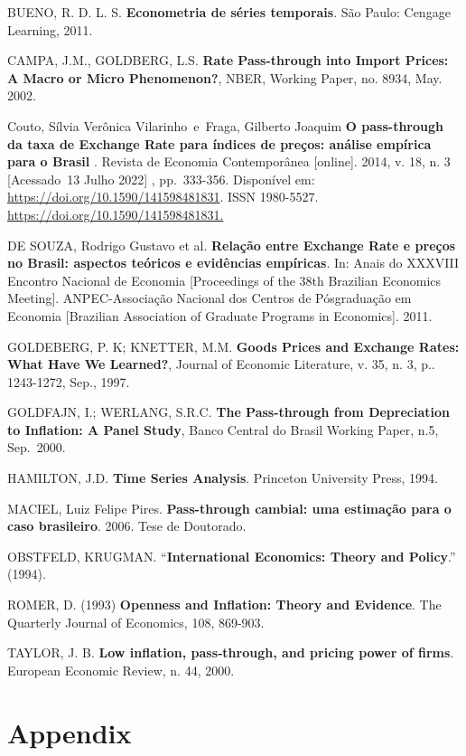 \documentclass[12pt]{article}
\begin{document}
BUENO, R. D. L. S. \textbf{Econometria de séries temporais}. São Paulo:
Cengage Learning, 2011.

CAMPA, J.M., GOLDBERG, L.S. \textbf{Rate Pass-through into Import
Prices: A Macro or Micro Phenomenon?}, NBER, Working Paper, no. 8934,
May. 2002.

Couto, Sílvia Verônica Vilarinho~e~Fraga, Gilberto Joaquim \textbf{O
pass-through da taxa de Exchange Rate para índices de preços: análise
empírica para o Brasil} . Revista de Economia Contemporânea
{[}online{]}. 2014, v. 18, n. 3 {[}Acessado~13 Julho 2022{]} ,
pp.~333-356. Disponível em: \url{https://doi.org/10.1590/141598481831}.
ISSN 1980-5527. \url{https://doi.org/10.1590/141598481831.}

DE SOUZA, Rodrigo Gustavo et al. \textbf{Relação entre Exchange Rate e
preços no Brasil: aspectos teóricos e evidências empíricas}. In: Anais
do XXXVIII Encontro Nacional de Economia {[}Proceedings of the 38th
Brazilian Economics Meeting{]}. ANPEC-Associação Nacional dos Centros de
Pósgraduação em Economia {[}Brazilian Association of Graduate Programs
in Economics{]}. 2011.

GOLDEBERG, P. K; KNETTER, M.M. \textbf{Goods Prices and Exchange Rates:
What Have We Learned?}, Journal of Economic Literature, v. 35, n. 3, p..
1243-1272, Sep., 1997.

GOLDFAJN, I.; WERLANG, S.R.C. \textbf{The Pass-through from Depreciation
to Inflation: A Panel Study}, Banco Central do Brasil Working Paper,
n.5, Sep.~2000.

HAMILTON, J.D. \textbf{Time Series Analysis}. Princeton University
Press, 1994.

MACIEL, Luiz Felipe Pires. \textbf{Pass-through cambial: uma estimação
para o caso brasileiro}. 2006. Tese de Doutorado.

OBSTFELD, KRUGMAN. ``\textbf{International Economics: Theory and
Policy}.'' (1994).

ROMER, D. (1993) \textbf{Openness and Inflation: Theory and Evidence}.
The Quarterly Journal of Economics, 108, 869-903.

TAYLOR, J. B. \textbf{Low inflation, pass‑through, and pricing power of
firms}. European Economic Review, n. 44, 2000.

\hypertarget{appendix}{%
\section{Appendix}\label{appendix}}
\end{document}

